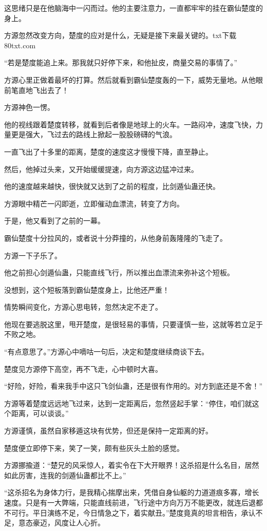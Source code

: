 \begin{this_body}
这思绪只是在他脑海中一闪而过。他的主要注意力，一直都牢牢的挂在霸仙楚度的身上。

方源忽然改变方向，楚度的应对是什么，无疑是接下来最关键的。txt下载80txt.com

“若是楚度能追上来。那我就只好停下来，和他扯皮，商量交易的事情了。”

方源心里正做着最坏的打算。然后就看到霸仙楚度轰的一下，威势无量地。从他眼前笔直地飞出去了！

方源神色一愣。

他的视线跟着楚度转移，就看到后者像是地球上的火车。一路闷冲，速度飞快，力量更是强大，飞过去的路线上掀起一股股磅礴的气浪。

一直飞出了十多里的距离，楚度的速度这才慢慢下降，直至静止。

然后，他掉过头来，又开始缓缓提速，向方源这边猛冲过来。

他的速度越来越快，很快就又达到了之前的程度，比剑遁仙蛊还快。

方源眼中精芒一闪即逝，立即催动血漂流，转变了方向。

于是，他又看到了之前的一幕。

霸仙楚度十分拉风的，或者说十分莽撞的，从他身前轰隆隆的飞走了。

方源一下子乐了。

他之前担心剑遁仙蛊，只能直线飞行，所以推出血漂流来弥补这个短板。

没想到，这个短板落到霸仙楚度身上，比他还严重！

情势瞬间变化，方源心思电转，忽然决定不走了。

他现在要逃脱这里，甩开楚度，是很轻易的事情，只要谨慎一些，这就等若立足于不败之地。

“有点意思了。”方源心中嘀咕一句后，决定和楚度继续商谈下去。

楚度见方源停下高空，再不飞走，心中顿时大喜。

“好险，好险，看来我手中这只飞剑仙蛊，还是很有作用的。对方到底还是不舍！”

方源等着楚度远远地飞过来，达到一定距离后，忽然竖起手掌：“停住，咱们就这个距离，可以谈谈。”

方源谨慎，虽然自家移遁这块有优势，但还是保持一定距离的好。

楚度便立即停下来，笑了一笑，颇有些灰头土脸的感觉。

方源挪揄道：“楚兄的风采惊人，着实令在下大开眼界！这杀招是什么名目，居然如此厉害，连我的剑遁仙蛊都比不上。”

“这杀招名为身体力行，是我精心揣摩出来，凭借自身仙躯的力道道痕多寡，增长速度。只是有一大弊端，只能直线前进，飞行途中方向万万不能更改，就连后退都不可行。平日演练不足，今日情急之下，着实献丑。”楚度竟真的坦言相告，承认不足，意态豪迈，风度让人心折。


\end{this_body}

